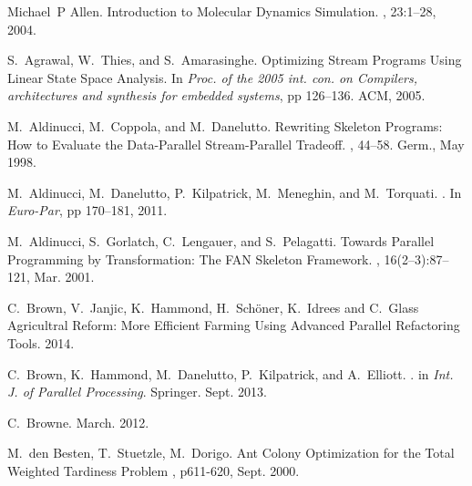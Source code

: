 \documentclass[smallextended]{svjour3}
\begin{document}




\begin{thebibliography}{}
Michael~P Allen.
\newblock Introduction to Molecular Dynamics Simulation.
,
  23:1--28, 2004.

S.~Agrawal, W.~Thies, and S.~Amarasinghe.
\newblock Optimizing Stream Programs Using Linear State Space Analysis.
\newblock In {\em Proc. of the 2005 int. con. on
  Compilers, architectures and synthesis for embedded systems}, pp 126--136.
  ACM, 2005.

M.~Aldinucci, M.~Coppola, and M.~Danelutto.
\newblock Rewriting {S}keleton {P}rograms: {H}ow to {E}valuate the
  {D}ata-{P}arallel {S}tream-{P}arallel {T}radeoff.
, 44--58. Germ., May 1998.

M.~Aldinucci, M.~Danelutto, P.~Kilpatrick, M.~Meneghin, and M.~Torquati.
.
\newblock In {\em Euro-Par}, pp 170--181, 2011.

M.~Aldinucci, S.~Gorlatch, C.~Lengauer, and S.~Pelagatti.
\newblock Towards {P}arallel {P}rogramming by {T}ransformation: {T}he {FAN}
  {S}keleton {F}ramework.
, 16(2--3):87--121, Mar.
  2001.

C.~Brown, V.~Janjic, K.~Hammond, H.~Sch\"oner, K.~Idrees and C.~Glass
\newblock Agricultral Reform: More Efficient Farming Using Advanced Parallel Refactoring Tools.
 2014.

C.~Brown, K.~Hammond, M.~Danelutto, P.~Kilpatrick, and A.~Elliott.
.
\newblock in {\em Int. J. of Parallel Processing}. Springer. Sept. 2013.

C.~Browne.
 March. 2012.

M.~den Besten, T.~Stuetzle, M.~Dorigo.
\newblock Ant Colony Optimization for the Total Weighted Tardiness
Problem
, p611-620, Sept. 2000.


\end{thebibliography}
\end{document}
